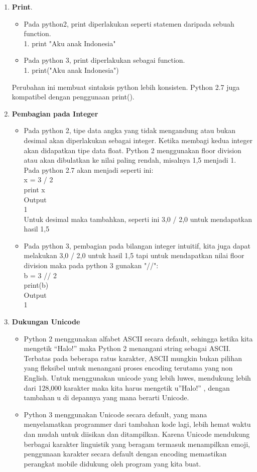 \documentclass{article}
\begin{document}
\begin{enumerate}
\item \textbf{Print}.
\begin{itemize}
\item Pada python2, print diperlakukan seperti statemen daripada sebuah function.\\ 
1. print "Aku anak Indonesia"
\item Pada python 3, print diperlakukan sebagai function.\\
1. print("Aku anak Indonesia")
\end{itemize}
Perubahan ini membuat sintaksis python lebih konsisten. Python 2.7 juga kompatibel dengan penggunaan print().
\item \textbf{Pembagian pada Integer}
\begin{itemize}
\item Pada python 2, tipe data angka yang tidak mengandung atau bukan desimal akan diperlakukan sebagai integer. Ketika membagi kedua integer akan didapatkan tipe data float. Python 2 menggunakan floor division atau akan dibulatkan ke nilai paling rendah, misalnya 1,5 menjadi 1. Pada python 2.7 akan menjadi seperti ini:\\
x = 3 / 2\\
print x\\
Output\\
1\\
Untuk desimal maka tambahkan, seperti ini 3,0 / 2,0 untuk mendapatkan hasil 1,5
\item Pada python 3, pembagian pada bilangan integer intuitif, kita juga dapat melakukan 3,0 / 2,0 untuk hasil 1,5 tapi untuk mendapatkan nilai floor division maka pada python 3 gunakan "//":\\
b = 3 // 2\\
print(b)\\
Output\\
1
\end{itemize}
\item \textbf{Dukungan Unicode}
\begin{itemize}
\item Python 2 menggunakan alfabet ASCII secara default, sehingga ketika kita mengetik “Halo!”  maka Python 2 menangani string sebagai ASCII. Terbatas pada beberapa ratus karakter, ASCII mungkin bukan pilihan yang fleksibel untuk menangani proses encoding terutama yang non English. Untuk menggunakan unicode yang lebih luwes, mendukung lebih dari 128,000 karakter maka kita harus mengetik u”Halo!” , dengan tambahan u  di depannya yang mana berarti Unicode.
\item Python 3 menggunakan Unicode secara default, yang mana menyelamatkan programmer dari tambahan kode lagi, lebih hemat waktu dan mudah untuk diisikan dan ditampilkan. Karena Unicode mendukung berbagai karakter linguistik yang beragam termasuk menampilkan emoji, penggunaan karakter secara default dengan encoding memastikan perangkat mobile didukung oleh program yang kita buat.
\end{itemize}
\end{enumerate}
\end{document}
